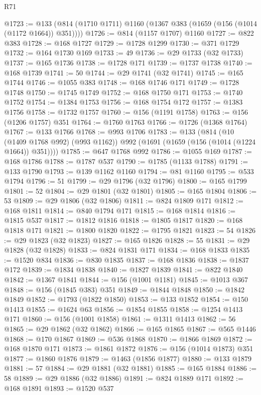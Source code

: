 \begin{lexlean}{R71}
\begin{coremodule}
@1723 := @133 (@814 (@1710 @1711) @1160 (@1367 @383 (@1659 (@156 (@1014 (@1172 @1664)) @351))))
@1726 := @814 (@1157 @1707) @1160
@1727 := @822 @383
@1728 := @168 @1727
@1729 := @1728 @1299
@1730 := @371 @1729
@1732 := @164 @1730 @169
@1733 := 49
@1736 := @29 @1733 (@32 @1733)
@1737 := @165 @1736
@1738 := @1728 @171
@1739 := @1737 @1738
@1740 := @168 @1739
@1741 := 50
@1744 := @29 @1741 (@32 @1741)
@1745 := @165 @1744
@1746 := @1055 @383
@1748 := @168 @1746 @171
@1749 := @1728 @1748
@1750 := @1745 @1749
@1752 := @168 @1750 @171
@1753 := @1740 @1752
@1754 := @1384 @1753
@1756 := @168 @1754 @172
@1757 := @1383 @1756
@1758 := @1732 @1757
@1760 := @156 (@1191 @1758)
@1763 := @156 (@1206 @1757) @351
@1764 := @1760 @1763
@1766 := @1726 (@1368 @1764)
@1767 := @133 @1766
@1768 := @993 @1706
@1783 := @133
    (@814
      (@10 (@1409 @1768 @992) (@993 @1162))
      @992
      (@1691 (@1659 (@156 (@1014 (@1224 @1664)) @351))))
@1785 := @647 @1768 @992
@1786 := @1055 @169
@1787 := @168 @1786
@1788 := @1787 @537
@1790 := @1785 (@1133 @1788)
@1791 := @133 @1790
@1793 := @139 @1162 @1160
@1794 := @81 @1160
@1795 := @533 @1794
@1796 := 51
@1799 := @29 @1796 (@32 @1796)
@1800 := @165 @1799
@1801 := 52
@1804 := @29 @1801 (@32 @1801)
@1805 := @165 @1804
@1806 := 53
@1809 := @29 @1806 (@32 @1806)
@1811 := @824 @1809 @171
@1812 := @168 @1811
@1814 := @840 @1794 @171
@1815 := @168 @1814
@1816 := @1815 @537
@1817 := @1812 @1816
@1818 := @1805 @1817
@1820 := @168 @1818 @171
@1821 := @1800 @1820
@1822 := @1795 @1821
@1823 := 54
@1826 := @29 @1823 (@32 @1823)
@1827 := @165 @1826
@1828 := 55
@1831 := @29 @1828 (@32 @1828)
@1833 := @824 @1831 @171
@1834 := @168 @1833
@1835 := @1520 @834
@1836 := @830 @1835
@1837 := @168 @1836
@1838 := @1837 @172
@1839 := @1834 @1838
@1840 := @1827 @1839
@1841 := @822 @1840
@1842 := @1367 @1841
@1844 := @156 (@1001 @1181)
@1845 := @1013 @367
@1848 := @156 (@1845 @383) @351
@1849 := @1844 @1848
@1850 := @1842 @1849
@1852 := @1793 (@1822 @1850)
@1853 := @133 @1852
@1854 := @150 @1413
@1855 := @1624 @63
@1856 := @1854 @1855
@1858 := @1254 @1413 @171
@1860 := @156 (@1001 @1858)
@1861 := @1311 @1413
@1862 := 56
@1865 := @29 @1862 (@32 @1862)
@1866 := @165 @1865
@1867 := @565 @1446
@1868 := @170 @1867
@1869 := @536 @1868
@1870 := @1866 @1869
@1872 := @168 @1870 @171
@1873 := @1861 @1872
@1876 := @156 (@1014 @1873) @351
@1877 := @1860 @1876
@1879 := @1463 (@1856 @1877)
@1880 := @133 @1879
@1881 := 57
@1884 := @29 @1881 (@32 @1881)
@1885 := @165 @1884
@1886 := 58
@1889 := @29 @1886 (@32 @1886)
@1891 := @824 @1889 @171
@1892 := @168 @1891
@1893 := @1520 @537

\end{coremodule}
\end{lexlean}

